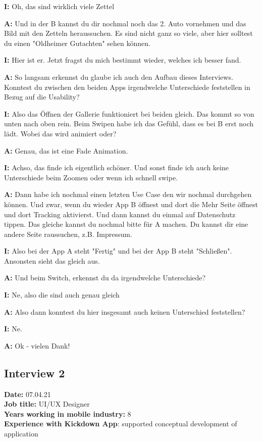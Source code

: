 \begin{myparindent}{0pt}
\textbf{I:} Oh, das sind wirklich viele Zettel 

\textbf{A:} Und in der B kannst du dir nochmal noch das 2. Auto vornehmen und das Bild mit den Zetteln  heraussuchen. Es sind nicht ganz so viele, aber hier solltest du einen "Oldheimer Gutachten" sehen können. 

\textbf{I:} Hier ist er. Jetzt fragst du mich bestimmt wieder, welches ich besser fand. 

\textbf{A:} So langsam erkennst du glaube ich auch den Aufbau dieses Interviews. Konntest du zwischen den beiden Apps irgendwelche Unterschiede feststellen in Bezug auf die Usability?

\textbf{I:} Also das Öffnen der Gallerie funktioniert bei beiden gleich. Das kommt so von unten nach oben rein. Beim Swipen habe ich das Gefühl, dass es bei  B erst noch lädt. Wobei das wird animiert oder?

\textbf{A:} Genau, das ist eine Fade Animation.

\textbf{I:} Achso, das finde ich eigentlich schöner. Und sonst finde ich auch keine Unterschiede beim Zoomen oder wenn ich schnell swipe. 

\textbf{A:} Dann habe ich nochmal einen letzten Use Case den wir nochmal durchgehen können. Und zwar, wenn du wieder App B öffnest und dort die Mehr Seite öffnest und dort Tracking aktivierst. Und dann kannst du einmal auf Datenschutz tippen. Das gleiche kannst du nochmal bitte für A machen. Du kannst dir eine andere Seite raussuchen, z.B. Impressum. 

\textbf{I:} Also bei der App A steht "Fertig" und bei der App B steht "Schließen". Ansonsten sieht das gleich aus.

\textbf{A:} Und beim Switch, erkennst du da irgendwelche Unterschiede?

\textbf{I:} Ne, also die sind auch genau gleich

\textbf{A:} Also dann konntest du hier insgesamt auch keinen Unterschied feststellen?

\textbf{I:} Ne.

\textbf{A:} Ok - vielen Dank!


\subsection{Interview 2}
\textbf{Date:} 07.04.21\\
\textbf{Job title:} UI/UX Designer\\
\textbf{Years working in mobile industry:} 8\\
\textbf{Experience with Kickdown App}: supported conceptual development of application\\


\end{myparindent}
